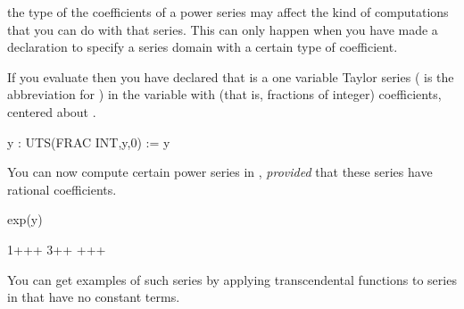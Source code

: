 {{{{{{{{{{{{{{\beginImportant
{}
the type of the coefficients of a power series may
affect the kind of computations that you can do with that series.
This can only happen when you have made a declaration to
specify a series domain with a certain type of coefficient.
\endImportant

\begin{xtc}
\begin{xtccomment}
If you evaluate
then you have declared that  is a one variable Taylor series
( is the abbreviation for )
in the variable  with 
(that is, fractions of integer) coefficients, centered about .
\end{xtccomment}
\begin{spadsrc}
y : UTS(FRAC INT,y,0) := y 
\end{spadsrc}
\begin{TeXOutput}
\begin{fricasmath}{4}
%
\end{fricasmath}
\end{TeXOutput}
\end{xtc}
%
\begin{xtc}
\begin{xtccomment}
You can now compute certain power series in ,
{\it provided} that these series have rational coefficients.
\end{xtccomment}
\begin{spadsrc}
exp(y) 
\end{spadsrc}
\begin{TeXOutput}
\begin{fricasmath}{5}
1++\TIMES {}+\TIMES \SUPER%
{}{3}+\TIMES {}+\TIMES %
+\TIMES {}+\TIMES {}+%
\end{fricasmath}
\end{TeXOutput}
\end{xtc}
%
\begin{xtc}
\begin{xtccomment}
You can get examples of such series
by applying transcendental functions to
series in  that have no constant terms.
\end{xtccomment}

\end{xtc}}}}}}}}}}}}}}}
